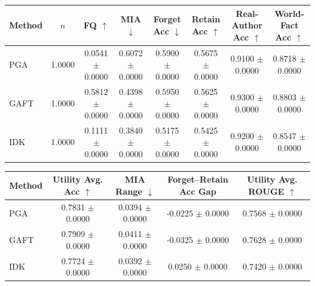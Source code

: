 \begin{tabular}{lccccccc}
\hline
Method & $n$ & FQ $\uparrow$ & MIA $\downarrow$ & Forget Acc $\downarrow$ & Retain Acc $\uparrow$ & Real-Author Acc $\uparrow$ & World-Fact Acc $\uparrow$ \\
\hline
PGA & 1.0000 & 0.0541 $\pm$ 0.0000 & 0.6072 $\pm$ 0.0000 & 0.5900 $\pm$ 0.0000 & 0.5675 $\pm$ 0.0000 & 0.9100 $\pm$ 0.0000 & 0.8718 $\pm$ 0.0000 \\
GAFT & 1.0000 & 0.5812 $\pm$ 0.0000 & 0.4398 $\pm$ 0.0000 & 0.5950 $\pm$ 0.0000 & 0.5625 $\pm$ 0.0000 & 0.9300 $\pm$ 0.0000 & 0.8803 $\pm$ 0.0000 \\
IDK & 1.0000 & 0.1111 $\pm$ 0.0000 & 0.3840 $\pm$ 0.0000 & 0.5175 $\pm$ 0.0000 & 0.5425 $\pm$ 0.0000 & 0.9200 $\pm$ 0.0000 & 0.8547 $\pm$ 0.0000 \\
\hline
\end{tabular}

\begin{tabular}{lcccc}
\hline
Method & Utility Avg. Acc $\uparrow$ & MIA Range $\downarrow$ & Forget--Retain Acc Gap & Utility Avg. ROUGE $\uparrow$ \\
\hline
PGA & 0.7831 $\pm$ 0.0000 & 0.0394 $\pm$ 0.0000 & -0.0225 $\pm$ 0.0000 & 0.7568 $\pm$ 0.0000 \\
GAFT & 0.7909 $\pm$ 0.0000 & 0.0411 $\pm$ 0.0000 & -0.0325 $\pm$ 0.0000 & 0.7628 $\pm$ 0.0000 \\
IDK & 0.7724 $\pm$ 0.0000 & 0.0392 $\pm$ 0.0000 & 0.0250 $\pm$ 0.0000 & 0.7420 $\pm$ 0.0000 \\
\hline
\end{tabular}
